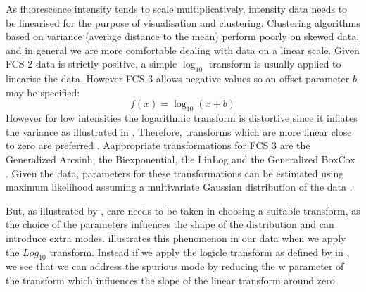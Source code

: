 As fluorescence intensity tends to scale multiplicatively, intensity data needs to be linearised for the purpose of visualisation and clustering.
Clustering algorithms based on variance (average distance to the mean) perform poorly on skewed data, and in general we are more comfortable dealing
with data on a linear scale.
Given FCS 2 data is strictly positive, a simple $\log_{10}$ transform is usually applied to linearise the data.
However FCS 3 allows negative values so an offset parameter $b$ may be specified:
\[
    f(x) = \log_{10}(x+b)
\]
However for low intensities the logarithmic transform is distortive since it inflates the variance as illustrated in .
Therefore, transforms which are more linear close to zero are preferred \citep{Durbin:2002tj,Tung:2006uw}.
Aappropriate transformations for FCS 3 are the Generalized Arcsinh, the Biexponential, the LinLog and the Generalized BoxCox
\citep{Bagwell:2005he,Parks:2006gaa,Finak:2010is}.
Given the data, parameters for these transformations can be estimated using maximum likelihood assuming a multivariate Gaussian distribution of the data \citep{Finak:2010is}. 

But, as illustrated by \citet{Tung:2006uw}, care needs to be taken in choosing a suitable transform, as the choice of the parameters
infuences the shape of the distribution and can introduce extra modes.
 illustrates this phenomenon in our data when we apply the $Log_{10}$ transform.
Instead if we apply the logicle transform as defined by \citet{Parks:2006gaa} in ,
we see that we can address the spurious mode by reducing the w parameter of the transform which influences the slope of the linear transform around zero.

